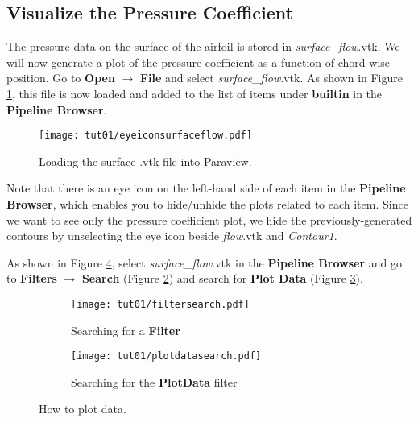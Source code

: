 \subsection{Visualize the Pressure Coefficient}
The pressure data on the surface of the airfoil is stored in \textit{surface\_flow}.vtk. We will now generate a plot of the pressure coefficient as a function of chord-wise position. Go to \textbf{Open} $\rightarrow$ \textbf{File} and select \textit{surface\_flow}.vtk. As shown in Figure \ref{fig1:builtin}, this file is now loaded and added to the list of items under \textbf{builtin} in the \textbf{Pipeline Browser}.
\begin{figure}[htbp]
    \centering
    \texttt{[image: tut01/eyeiconsurfaceflow.pdf]}
    \caption{Loading the surface .vtk file into Paraview.}
    \label{fig1:builtin}
\end{figure}
Note that there is an eye icon on the left-hand side of each item in the \textbf{Pipeline Browser}, which enables you to hide/unhide the plots related to each item. Since we want to see only the pressure coefficient plot, we hide the previously-generated contours by unselecting the eye icon beside \textit{flow}.vtk and \textit{Contour1}. 

As shown in Figure \ref{fig1:plotdata}, select \textit{surface\_flow}.vtk in the \textbf{Pipeline Browser} and go to \textbf{Filters} $\rightarrow$ \textbf{Search} (Figure \ref{fig1:plotdata a}) and search for \textbf{Plot Data} (Figure \ref{fig1:plotdata b}). 
\begin{figure}[htbp]
    \centering
     \begin{subfigure}[b]{.4\textwidth}
         \centering
         \texttt{[image: tut01/filtersearch.pdf]}
         \caption{Searching for a \textbf{Filter}}
         \label{fig1:plotdata a}
     \end{subfigure}
     \hfill
     \begin{subfigure}[b]{.4\textwidth}
         \centering
         \texttt{[image: tut01/plotdatasearch.pdf]}
         \caption{Searching for the \textbf{PlotData} filter}
         \label{fig1:plotdata b}
     \end{subfigure}     
    \caption{How to plot data.}
    \label{fig1:plotdata}
\end{figure}

